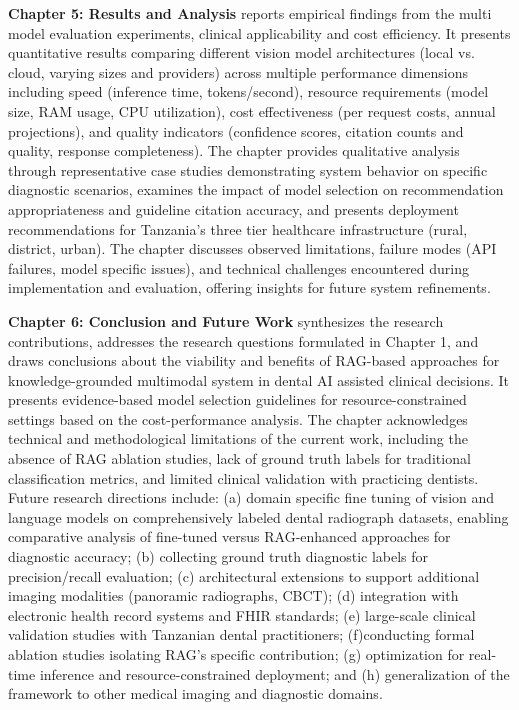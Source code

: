 \documentclass[12pt,a4paper]{report}
\begin{document}
	\textbf{Chapter 5: Results and Analysis} reports empirical findings from the multi model evaluation experiments, clinical applicability and cost efficiency. It presents quantitative results comparing different vision model architectures (local vs. cloud, varying sizes and providers) across multiple performance dimensions including speed (inference time, tokens/second), resource requirements (model size, RAM usage, CPU utilization), cost effectiveness (per request costs, annual projections), and quality indicators (confidence scores, citation counts and quality, response completeness). The chapter provides qualitative analysis through representative case studies demonstrating system behavior on specific diagnostic scenarios, examines the impact of model selection on recommendation appropriateness and guideline citation accuracy, and presents deployment recommendations for Tanzania's three tier healthcare infrastructure (rural, district, urban). The chapter discusses observed limitations, failure modes (API failures, model specific issues), and technical challenges encountered during implementation and evaluation, offering insights for future system refinements.
	
	\textbf{Chapter 6: Conclusion and Future Work} synthesizes the research contributions, addresses the research questions formulated in Chapter 1, and draws conclusions about the viability and benefits of RAG-based approaches for knowledge-grounded multimodal system in dental AI assisted clinical decisions. It presents evidence-based model selection guidelines for resource-constrained settings based on the cost-performance analysis. The chapter acknowledges technical and methodological limitations of the current work, including the absence of RAG ablation studies, lack of ground truth labels for traditional classification metrics, and limited clinical validation with practicing dentists. Future research directions include: 
	(a) domain specific fine tuning of vision and language models on comprehensively labeled dental radiograph datasets, enabling comparative analysis of fine-tuned versus RAG-enhanced approaches for diagnostic accuracy;
	(b) collecting ground truth diagnostic labels for precision/recall evaluation; (c) architectural extensions to support additional imaging modalities (panoramic radiographs, CBCT); (d) integration with electronic health record systems and FHIR standards; (e) large-scale clinical validation studies with Tanzanian dental practitioners; (f)conducting formal ablation studies isolating RAG's specific contribution; (g) optimization for real-time inference and resource-constrained deployment; and (h) generalization of the framework to other medical imaging and diagnostic domains.
	
\end{document}
